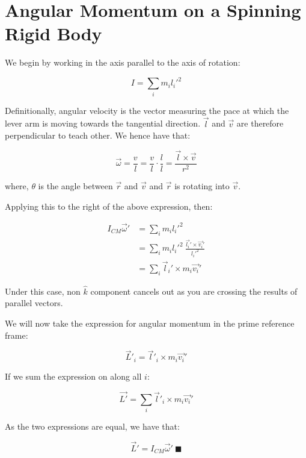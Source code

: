 \documentclass[letterpaper]{article}
\begin{document}
\section{Angular Momentum on a Spinning Rigid Body}
\label{sec:org9effd31}
We begin by working in the axis parallel to the axis of rotation:

\begin{equation}
   I = \sum_i m_i {l_i'}^2 
\end{equation}

Definitionally, angular velocity is the vector measuring the pace at which the lever arm is moving towards the tangential direction. \(\vec{l}\) and \(\vec{v}\) are therefore perpendicular to teach other. We hence have that:

\begin{equation}
   \vec{\omega} = \frac{v}{l} = \frac{v}{l}\cdot\frac{l}{l} =  \frac{\vec{l} \times \vec{v}}{r^2}
\end{equation}

where, \(\theta\) is the angle between \(\vec{r}\) and \(\vec{v}\) and \(\vec{r}\) is rotating into \(\vec{v}\).

Applying this to the right of the above expression, then:

\begin{align}
   I_{CM} \vec{\omega}' &= \sum_i m_i {l_i}'^2 \\
&= \sum_i m_i {l_i}'^2\ \frac{\vec{l_i}' \times \vec{v_i}'}{{l_i}'^2}\\
&= \sum_i \vec{l}_i' \times m_i \vec{v_i}'
\end{align}

Under this case, non \(\hat{k}\) component cancels out as you are crossing the results of parallel vectors.

We will now take the expression for angular momentum in the prime reference frame:

\begin{equation}
   \vec{L}'_i = \vec{l}'_i \times m_i\vec{v_i}'
\end{equation}

If we sum the expression on along all \(i\):

\begin{equation}
   \vec{L'} = \sum_i \vec{l}'_i \times m_i\vec{v_i}'
\end{equation}

As the two expressions are equal, we have that:

\begin{equation}
    \vec{L}' = I_{CM} \vec{\omega}'\ \blacksquare
\end{equation}
\end{document}
